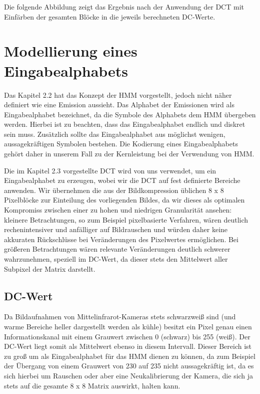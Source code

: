 Die folgende Abbildung zeigt das Ergebnis nach der Anwendung der DCT mit Einfärben der gesamten Blöcke in die jeweils berechneten DC-Werte.

\section{Modellierung eines Eingabealphabets}

Das Kapitel 2.2 hat das Konzept der HMM vorgestellt, jedoch nicht näher definiert wie eine Emission aussieht. Das Alphabet der Emissionen wird als Eingabealphabet bezeichnet, da die Symbole des Alphabets dem HMM übergeben werden. Hierbei ist zu beachten, dass das Eingabealphabet endlich und diskret sein muss. Zusätzlich sollte das Eingabealphabet aus möglichst wenigen, aussagekräftigen Symbolen bestehen. Die Kodierung eines Eingabealphabets gehört daher in unserem Fall zu der Kernleistung bei der Verwendung von HMM. 

Die im Kapitel 2.3 vorgestellte DCT wird von uns verwendet, um ein Eingabealphabet zu erzeugen, wobei wir die DCT auf fest definierte Bereiche anwenden. Wir übernehmen die aus der Bildkompression üblichen 8 x 8 Pixelblöcke zur Einteilung des vorliegenden Bildes, da wir dieses als optimalen Kompromiss zwischen einer zu hohen und niedrigen Granularität ansehen: kleinere Betrachtungen, so zum Beispiel pixelbasierte Verfahren, wären deutlich rechenintensiver und anfälliger auf Bildrauschen und würden daher keine akkuraten Rückschlüsse bei Veränderungen des Pixelwertes ermöglichen. Bei größeren Betrachtungen wären relevante Veränderungen deutlich schwerer wahrzunehmen, speziell im DC-Wert, da dieser stets den Mittelwert aller Subpixel der Matrix darstellt. 

\subsection{DC-Wert}

Da Bildaufnahmen von Mittelinfrarot-Kameras stets schwarzweiß sind (und warme Bereiche heller dargestellt werden als kühle) besitzt ein Pixel genau einen Informationskanal mit einem Grauwert zwischen 0 (schwarz) bis 255 (weiß). Der DC-Wert liegt somit als Mittelwert ebenso in diesem Intervall. Dieser Bereich ist zu groß um als Eingabealphabet für das HMM dienen zu können, da zum Beispiel der Übergang von einem Grauwert von 230 auf 235 nicht aussagekräftig ist, da es sich hierbei um Rauschen oder aber eine Neukalibrierung der Kamera, die sich ja stets auf die gesamte 8 x 8 Matrix auswirkt, halten kann. 


